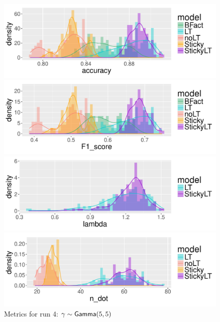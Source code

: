 \begin{figure}[tb]
  \centering
  \begin{minipage}{0.75\textwidth}
  \includegraphics[width = \textwidth]{fig/cocktail/synth_s16_m12/hyper_gamma/h10.0_nocs_cp0/a5b5/accuracy_density.pdf}
\end{minipage}

\begin{minipage}{0.75\textwidth}
  \includegraphics[width = \textwidth]{fig/cocktail/synth_s16_m12/hyper_gamma/h10.0_nocs_cp0/a5b5/F1_score_density.pdf}
\end{minipage}

\begin{minipage}{0.75\textwidth}
  \includegraphics[width = \textwidth]{fig/cocktail/synth_s16_m12/hyper_gamma/h10.0_nocs_cp0/a5b5/lambda_density.pdf}
\end{minipage}

\begin{minipage}{0.75\textwidth}
  \includegraphics[width = \textwidth]{fig/cocktail/synth_s16_m12/hyper_gamma/h10.0_nocs_cp0/a5b5/n_dot_density.pdf}
\end{minipage}
\caption{Metrics for run 4: $\gamma \sim \mathsf{Gamma}(5,5)$}
\end{figure}

